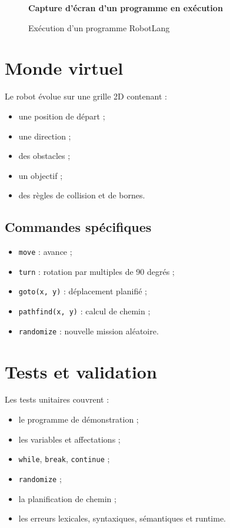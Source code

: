 \documentclass[12pt,a4paper]{article}
\begin{document}
\begin{figure}[h!]
  \centering
  \begin{futuristicbox}[width=0.9\textwidth,height=5.2cm]
    \centering \vspace*{1.5cm}
    \textbf{Capture d'écran d'un programme en exécution}
  \end{futuristicbox}
  \caption{Exécution d'un programme RobotLang}
\end{figure}

\section{Monde virtuel}

Le robot évolue sur une grille 2D contenant :
\begin{itemize}[nosep]
  \item une position de départ ;
  \item une direction ;
  \item des obstacles ;
  \item un objectif ;
  \item des règles de collision et de bornes.
\end{itemize}

\subsection{Commandes spécifiques}

\begin{itemize}[nosep]
  \item \texttt{move} : avance ;
  \item \texttt{turn} : rotation par multiples de 90 degrés ;
  \item \texttt{goto(x, y)} : déplacement planifié ;
  \item \texttt{pathfind(x, y)} : calcul de chemin ;
  \item \texttt{randomize} : nouvelle mission aléatoire.
\end{itemize}

\section{Tests et validation}

Les tests unitaires couvrent :
\begin{itemize}[nosep]
  \item le programme de démonstration ;
  \item les variables et affectations ;
  \item \texttt{while}, \texttt{break}, \texttt{continue} ;
  \item \texttt{randomize} ;
  \item la planification de chemin ;
  \item les erreurs lexicales, syntaxiques, sémantiques et runtime.
\end{itemize}
\end{document}
